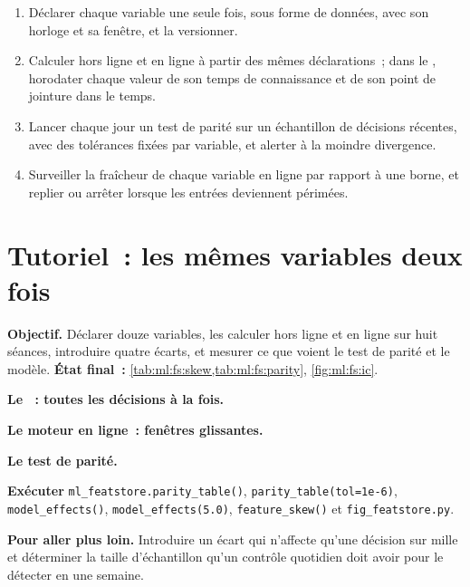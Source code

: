\begin{method}\label{met:ml:fs:method}
\begin{enumerate}
\item Déclarer chaque variable une seule fois, sous forme de données, avec son horloge et sa fenêtre, et la versionner.
\item Calculer hors ligne et en ligne à partir des mêmes déclarations~; dans le , horodater chaque valeur de son temps de connaissance
et de son point de jointure dans le temps.
\item Lancer chaque jour un test de parité sur un échantillon de décisions récentes, avec des tolérances fixées par variable, et alerter à la moindre divergence.
\item Surveiller la fraîcheur de chaque variable en ligne par rapport à une borne, et replier ou arrêter lorsque les entrées deviennent périmées.
\end{enumerate}
\end{method}

\section{Tutoriel~: les mêmes variables deux fois}\label{tut:ml:data-and-feature-stores:tut}

\begin{tutorial}
\textbf{Objectif.} Déclarer douze variables, les calculer hors ligne et en ligne sur huit séances, introduire quatre écarts, et mesurer ce que
voient le test de parité et le modèle. \textbf{État final~:} \cref{tab:ml:fs:skew,tab:ml:fs:parity}, \cref{fig:ml:fs:ic}.
\begin{tutsteps}
\item \textbf{Le ~: toutes les décisions à la fois.}
\label{lst:ml:fs:offline}
\item \textbf{Le moteur en ligne~: fenêtres glissantes.}
\label{lst:ml:fs:online}
\item \textbf{Le test de parité.}
\label{lst:ml:fs:parity}
\item \textbf{Exécuter} \texttt{ml\_featstore.parity\_table()}, \texttt{parity\_table(tol=1e-6)}, \texttt{model\_effects()},
\texttt{model\_effects(5.0)}, \texttt{feature\_skew()} et \texttt{fig\_featstore.py}.
\end{tutsteps}
\textbf{Pour aller plus loin.} Introduire un écart qui n'affecte qu'une décision sur mille et déterminer la taille d'échantillon qu'un contrôle quotidien doit avoir
pour le détecter en une semaine.
\end{tutorial}

